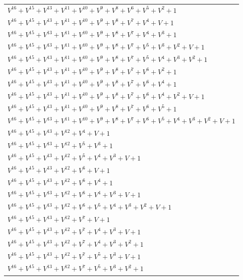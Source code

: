 \documentclass[12pt]{article}
\begin{document}
\begin{adjustwidth}{-4cm}{}
\begin{center}
\begin{longtable}{|l|}
$V^{16}  +V^{15}  +V^{13}  +V^{11}  +V^{10}  +V^{9}  +V^{8}  +V^{6}  +V^{5}  +V^{2}  + 1$ \\
$V^{16}  +V^{15}  +V^{13}  +V^{11}  +V^{10}  +V^{9}  +V^{8}  +V^{7}  +V^{4}  + V + 1$ \\
$V^{16}  +V^{15}  +V^{13}  +V^{11}  +V^{10}  +V^{9}  +V^{8}  +V^{7}  +V^{4}  +V^{3}  + 1$ \\
$V^{16}  +V^{15}  +V^{13}  +V^{11}  +V^{10}  +V^{9}  +V^{8}  +V^{7}  +V^{5}  +V^{3}  +V^{2}  + V + 1$ \\
$V^{16}  +V^{15}  +V^{13}  +V^{11}  +V^{10}  +V^{9}  +V^{8}  +V^{7}  +V^{5}  +V^{4}  +V^{3}  +V^{2}  + 1$ \\
$V^{16}  +V^{15}  +V^{13}  +V^{11}  +V^{10}  +V^{9}  +V^{8}  +V^{7}  +V^{6}  +V^{2}  + 1$ \\
$V^{16}  +V^{15}  +V^{13}  +V^{11}  +V^{10}  +V^{9}  +V^{8}  +V^{7}  +V^{6}  +V^{4}  + 1$ \\
$V^{16}  +V^{15}  +V^{13}  +V^{11}  +V^{10}  +V^{9}  +V^{8}  +V^{7}  +V^{6}  +V^{4}  +V^{2}  + V + 1$ \\
$V^{16}  +V^{15}  +V^{13}  +V^{11}  +V^{10}  +V^{9}  +V^{8}  +V^{7}  +V^{6}  +V^{5}  + 1$ \\
$V^{16}  +V^{15}  +V^{13}  +V^{11}  +V^{10}  +V^{9}  +V^{8}  +V^{7}  +V^{6}  +V^{5}  +V^{4}  +V^{3}  +V^{2}  + V + 1$ \\
$V^{16}  +V^{15}  +V^{13}  +V^{12}  +V^{4}  + V + 1$ \\
$V^{16}  +V^{15}  +V^{13}  +V^{12}  +V^{5}  +V^{3}  + 1$ \\
$V^{16}  +V^{15}  +V^{13}  +V^{12}  +V^{5}  +V^{4}  +V^{3}  + V + 1$ \\
$V^{16}  +V^{15}  +V^{13}  +V^{12}  +V^{6}  + V + 1$ \\
$V^{16}  +V^{15}  +V^{13}  +V^{12}  +V^{6}  +V^{4}  + 1$ \\
$V^{16}  +V^{15}  +V^{13}  +V^{12}  +V^{6}  +V^{4}  +V^{3}  + V + 1$ \\
$V^{16}  +V^{15}  +V^{13}  +V^{12}  +V^{6}  +V^{5}  +V^{4}  +V^{3}  +V^{2}  + V + 1$ \\
$V^{16}  +V^{15}  +V^{13}  +V^{12}  +V^{7}  + V + 1$ \\
$V^{16}  +V^{15}  +V^{13}  +V^{12}  +V^{7}  +V^{4}  +V^{3}  + V + 1$ \\
$V^{16}  +V^{15}  +V^{13}  +V^{12}  +V^{7}  +V^{4}  +V^{3}  +V^{2}  + 1$ \\
$V^{16}  +V^{15}  +V^{13}  +V^{12}  +V^{7}  +V^{5}  +V^{3}  + V + 1$ \\
$V^{16}  +V^{15}  +V^{13}  +V^{12}  +V^{7}  +V^{5}  +V^{3}  +V^{2}  + 1$ \\

\end{longtable}
\end{center}
\end{adjustwidth}
\end{document}
